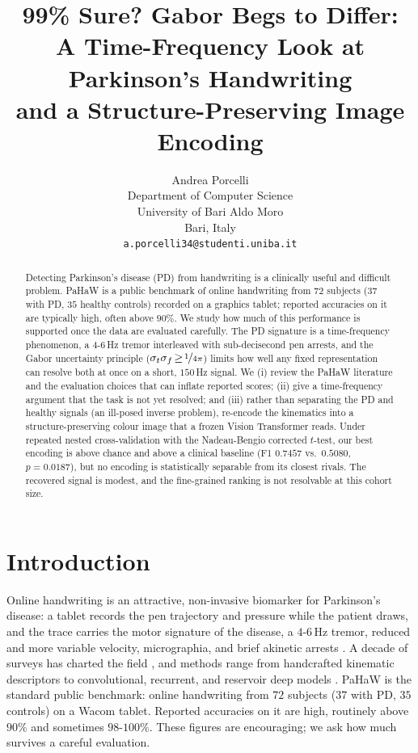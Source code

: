 \documentclass{article}
\title{99\% Sure? Gabor Begs to Differ:\\
A Time-Frequency Look at Parkinson's Handwriting\\
and a Structure-Preserving Image Encoding}
\author{%
  Andrea Porcelli \\
  Department of Computer Science \\
  University of Bari Aldo Moro \\
  Bari, Italy \\
  \texttt{a.porcelli34@studenti.uniba.it}
}
\begin{document}
\maketitle

\begin{abstract}
Detecting Parkinson's disease (PD) from handwriting is a clinically useful and
difficult problem. PaHaW is a public benchmark of online handwriting from $72$
subjects ($37$ with PD, $35$ healthy controls) recorded on a graphics tablet;
reported accuracies on it are typically high, often above $90\%$. We study how much
of this performance is supported once the data are evaluated carefully. The PD
signature is a time-frequency phenomenon, a $4$-$6$\,Hz tremor interleaved with
sub-decisecond pen arrests, and the Gabor uncertainty principle
($\sigma_t\sigma_f\!\ge\!\nicefrac{1}{4\pi}$) limits how well any fixed representation
can resolve both at once on a short, $150$\,Hz signal. We (i) review the PaHaW
literature and the evaluation choices that can inflate reported scores; (ii) give a
time-frequency argument that the task is not yet resolved; and (iii) rather than
separating the PD and healthy signals (an ill-posed inverse problem), re-encode the
kinematics into a structure-preserving colour image that a frozen Vision Transformer
reads. Under repeated nested cross-validation with the Nadeau-Bengio corrected
$t$-test, our best encoding is above chance and above a clinical baseline
(F1 $0.7457$ vs.\ $0.5080$, $p=0.0187$), but no encoding is statistically separable from its
closest rivals. The recovered signal is modest, and the fine-grained ranking is not
resolvable at this cohort size.
\end{abstract}

\section{Introduction}
\label{sec:intro}
Online handwriting is an attractive, non-invasive biomarker for Parkinson's disease:
a tablet records the pen trajectory and pressure while the patient draws, and the
trace carries the motor signature of the disease, a $4$-$6$\,Hz tremor, reduced and
more variable velocity, micrographia, and brief akinetic arrests
\citep{drotar2016,impedovo2019}. A decade of surveys has charted the field
\citep{impedovo2019review,vessio2019,destefano2019,aouraghe2023}, and methods range
from handcrafted kinematic descriptors to convolutional, recurrent, and reservoir
deep models \citep{pereira2018,gallicchio2018,diaz2021}. PaHaW \citep{drotar2016} is the standard public benchmark: online handwriting from
$72$ subjects ($37$ with PD, $35$ controls) on a Wacom tablet. Reported accuracies on
it are high, routinely above $90\%$ and sometimes $98$-$100\%$. These figures are
encouraging; we ask how much survives a careful evaluation.
\end{document}
